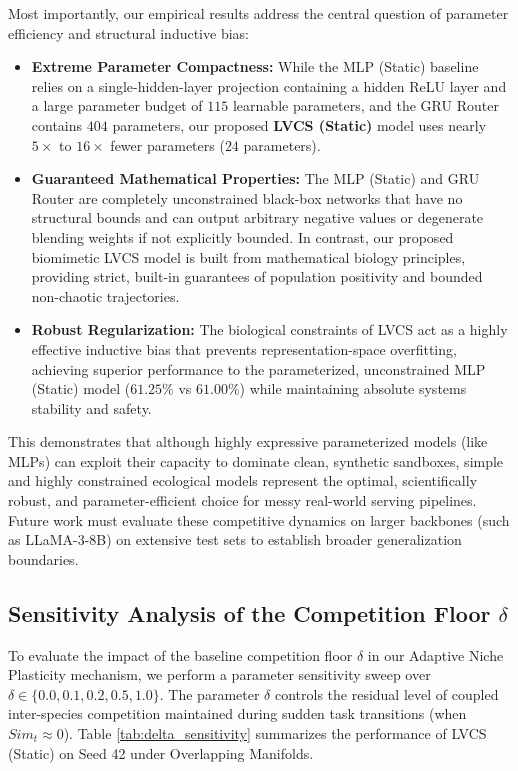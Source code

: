 Most importantly, our empirical results address the central question of parameter efficiency and structural inductive bias:
\begin{itemize}
    \item \textbf{Extreme Parameter Compactness:} While the MLP (Static) baseline relies on a single-hidden-layer projection containing a hidden ReLU layer and a large parameter budget of $115$ learnable parameters, and the GRU Router contains $404$ parameters, our proposed \textbf{LVCS (Static)} model uses nearly $5\times$ to $16\times$ fewer parameters ($24$ parameters). 
    \item \textbf{Guaranteed Mathematical Properties:} The MLP (Static) and GRU Router are completely unconstrained black-box networks that have no structural bounds and can output arbitrary negative values or degenerate blending weights if not explicitly bounded. In contrast, our proposed biomimetic LVCS model is built from mathematical biology principles, providing strict, built-in guarantees of population positivity and bounded non-chaotic trajectories.
    \item \textbf{Robust Regularization:} The biological constraints of LVCS act as a highly effective inductive bias that prevents representation-space overfitting, achieving superior performance to the parameterized, unconstrained MLP (Static) model ($61.25\%$ vs $61.00\%$) while maintaining absolute systems stability and safety.
\end{itemize}
This demonstrates that although highly expressive parameterized models (like MLPs) can exploit their capacity to dominate clean, synthetic sandboxes, simple and highly constrained ecological models represent the optimal, scientifically robust, and parameter-efficient choice for messy real-world serving pipelines. Future work must evaluate these competitive dynamics on larger backbones (such as LLaMA-3-8B) on extensive test sets to establish broader generalization boundaries.

\subsection{Sensitivity Analysis of the Competition Floor $\delta$}
To evaluate the impact of the baseline competition floor $\delta$ in our Adaptive Niche Plasticity mechanism, we perform a parameter sensitivity sweep over $\delta \in \{0.0, 0.1, 0.2, 0.5, 1.0\}$. The parameter $\delta$ controls the residual level of coupled inter-species competition maintained during sudden task transitions (when $Sim_t \approx 0$). Table \ref{tab:delta_sensitivity} summarizes the performance of LVCS (Static) on Seed 42 under Overlapping Manifolds.

